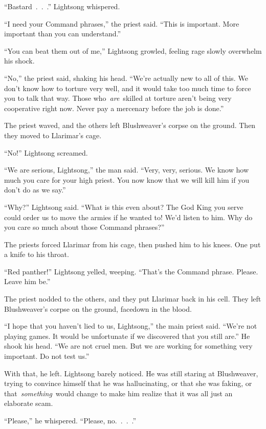 “Bastard~.~.~.” Lightsong whispered.

“I need your Command phrases,” the priest said. “This is important. More important than you can understand.”

“You can beat them out of me,” Lightsong growled, feeling rage slowly overwhelm his shock.

“No,” the priest said, shaking his head. “We’re actually new to all of this. We don’t know how to torture very well, and it would take too much time to force you to talk that way. Those who~\textit{are}~skilled at torture aren’t being very cooperative right now. Never pay a mercenary before the job is done.”

The priest waved, and the others left Blushweaver’s corpse on the ground. Then they moved to Llarimar’s cage.

“No!” Lightsong screamed.

“We are serious, Lightsong,” the man said. “Very, very, serious. We know how much you care for your high priest. You now know that we will kill him if you don’t do as we say.”

“Why?” Lightsong said. “What is this even about? The God King you serve could order us to move the armies if he wanted to! We’d listen to him. Why do you care so much about those Command phrases?”

The priests forced Llarimar from his cage, then pushed him to his knees. One put a knife to his throat.

“Red panther!” Lightsong yelled, weeping. “That’s the Command phrase. Please. Leave him be.”

The priest nodded to the others, and they put Llarimar back in his cell. They left Blushweaver’s corpse on the ground, facedown in the blood.

“I hope that you haven’t lied to us, Lightsong,” the main priest said. “We’re not playing games. It would be unfortunate if we discovered that you still are.” He shook his head. “We are not cruel men. But we are working for something very important. Do not test us.”

With that, he left. Lightsong barely noticed. He was still staring at Blushweaver, trying to convince himself that he was hallucinating, or that she was faking, or that~\textit{something}~would change to make him realize that it was all just an elaborate scam.

“Please,” he whispered. “Please, no.~.~.~.”

